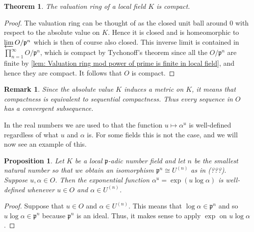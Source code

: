 \documentclass{article}
\newtheorem{theorem}{Theorem}[section]
\newtheorem{proposition}{Proposition}[section]
\newtheorem{remark}{Remark}[section]
\newcommand{\mfrak}[1]{\mathfrak{#1}}
\begin{document}
\begin{theorem} \label{thm: Valuation ring in local field is compact}
    The valuation ring of a local field $K$ is compact.
\end{theorem}
\begin{proof}
    The valuation ring can be thought of as the closed unit ball around 0 with respect to the absolute value on $K$. Hence it is closed and is homeomorphic to $\varprojlim O / \mfrak p^n$ which is then of course also closed. This inverse limit is contained in $\prod_{n = 1}^\infty O / \mfrak p^n$, which is compact by Tychonoff's theorem since all the $O / \mfrak p^n$ are finite by \cref{lem: Valuation ring mod power of prime is finite in local field}, and hence they are compact. It follows that $O$ is compact.
\end{proof}
\begin{remark}\label{rem: Compactness is equivalent to sequential compactness}
    Since the absolute value $K$ induces a metric on $K$, it means that compactness is equivalent to sequential compactness. Thus every sequence in $O$ has a convergent subsequence.
\end{remark}

In the real numbers we are used to that the function $u \mapsto \alpha^u$ is well-defined regardless of what $u$ and $\alpha$ is. For some fields this is not the case, and we will now see an example of this. 

\begin{proposition}
    Let $K$ be a local $\mfrak p$-adic number field and let $n$ be the smallest natural number so that we obtain an isomorphism $\mfrak p^n \cong U^{(n)}$ as in (???). Suppose $u,\alpha \in O$. Then the exponential function $\alpha^u = \exp(u \log \alpha)$ is well-defined whenever $u \in O$ and $\alpha \in U^{(n)}$.
\end{proposition}
\begin{proof}
    Suppose that $u \in O$ and $\alpha \in U^{(n)}$. This means that $\log \alpha \in \mfrak p^n$ and so $u \log \alpha \in \mfrak p^n$ because $\mfrak p^n$ is an ideal. Thus, it makes sense to apply $\exp$ on $u \log \alpha$.
\end{proof}
\end{document}
